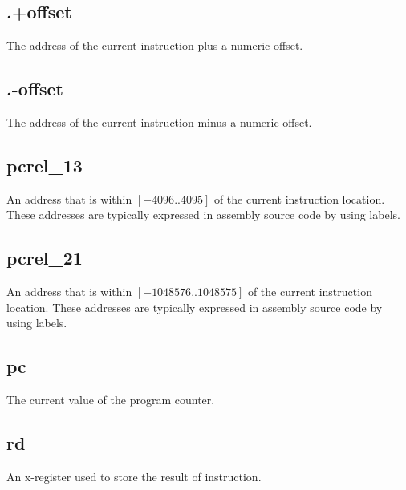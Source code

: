 \subsection{.+offset}

The address of the current instruction plus a numeric offset.

\subsection{.-offset}

The address of the current instruction minus a numeric offset.

\subsection{pcrel\_13}

An address that is within $[-4096..4095]$ of the current instruction location.
These addresses are typically expressed in assembly source code by using labels.

\subsection{pcrel\_21}

An address that is within $[-1048576..1048575]$ of the current instruction 
location.  
These addresses are typically expressed in assembly source code by using labels.

\subsection{pc}

The current value of the program counter.

\subsection{rd}

An x-register used to store the result of instruction.

